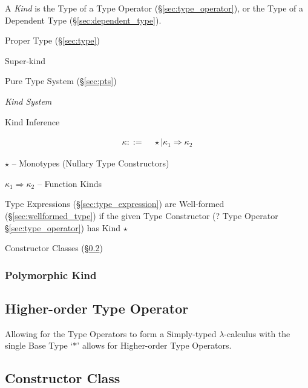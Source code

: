A \emph{Kind} is the Type of a Type Operator
(\S\ref{sec:type_operator}), or the Type of a Dependent Type
(\S\ref{sec:dependent_type}).

\fist Proper Type (\S\ref{sec:type})

Super-kind

Pure Type System (\S\ref{sec:pts})


\cite{jones95}


\emph{Kind System}

Kind Inference

\begin{align*}
  \kappa ::= &\; \star \mid \kappa_1 \Rightarrow \kappa_2
\end{align*}

$\star$ -- Monotypes (Nullary Type Constructors)

$\kappa_1 \Rightarrow \kappa_2$ -- Function Kinds

Type Expressions (\S\ref{sec:type_expression}) are Well-formed
(\S\ref{sec:wellformed_type}) if the given Type Constructor (? Type
Operator \S\ref{sec:type_operator}) has Kind $\star$

Constructor Classes (\S\ref{sec:constructor_class})



\subsubsection{Polymorphic Kind}\label{sec:polymorphic_kind}



\subsection{Higher-order Type Operator}
\label{sec:higherorder_typeoperator}

Allowing for the Type Operators to form a Simply-typed
$\lambda$-calculus with the single Base Type `$*$' allows for
Higher-order Type Operators.



\subsection{Constructor Class}\label{sec:constructor_class}

